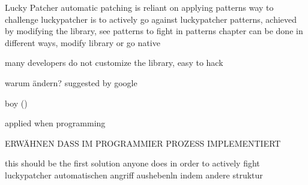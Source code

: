 Lucky Patcher automatic patching is reliant on applying patterns
%
way to challenge luckypatcher is to actively go against luckypatcher patterns, achieved by modifying the library, see patterns to fight in patterns chapter
can be done in different ways, modify library or go native

many developers do not customize the library, easy to hack
\cite{munteanLicense}
%



warum ändern?
suggested by google


boy ()

applied when programming






ERWÄHNEN DASS IM PROGRAMMIER PROZESS  IMPLEMENTIERT\newline

this should be the first solution anyone does in order to actively fight luckypatcher
automatischen angriff aushebenln indem andere struktur
